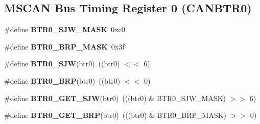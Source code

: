 \subsection*{M\+S\+C\+AN Bus Timing Register 0 (C\+A\+N\+B\+T\+R0)}
\begin{DoxyCompactItemize}
\item 
\mbox{\label{group__RTEMSBSPsPowerPCGen5200MSCAN_ga2837588f706fbf1850d8aadd7346655f}} 
\#define {\bfseries B\+T\+R0\+\_\+\+S\+J\+W\+\_\+\+M\+A\+SK}~0xc0
\item 
\mbox{\label{group__RTEMSBSPsPowerPCGen5200MSCAN_gab863420dd9b9aba2cc0e7e1f03f2c43e}} 
\#define {\bfseries B\+T\+R0\+\_\+\+B\+R\+P\+\_\+\+M\+A\+SK}~0x3f
\item 
\mbox{\label{group__RTEMSBSPsPowerPCGen5200MSCAN_ga30a29b01f89f3fe21ddac05c32a41b07}} 
\#define {\bfseries B\+T\+R0\+\_\+\+S\+JW}(btr0)~((btr0) $<$$<$ 6)
\item 
\mbox{\label{group__RTEMSBSPsPowerPCGen5200MSCAN_ga4943d2025c9b0978f3b5d155f8b93396}} 
\#define {\bfseries B\+T\+R0\+\_\+\+B\+RP}(btr0)~((btr0) $<$$<$ 0)
\item 
\mbox{\label{group__RTEMSBSPsPowerPCGen5200MSCAN_gabd5032d8668ccf5250d26463c6443308}} 
\#define {\bfseries B\+T\+R0\+\_\+\+G\+E\+T\+\_\+\+S\+JW}(btr0)~(((btr0) \& B\+T\+R0\+\_\+\+S\+J\+W\+\_\+\+M\+A\+SK) $>$$>$ 6)
\item 
\mbox{\label{group__RTEMSBSPsPowerPCGen5200MSCAN_gab3cb982bf563c9c882a3bfb5482de527}} 
\#define {\bfseries B\+T\+R0\+\_\+\+G\+E\+T\+\_\+\+B\+RP}(btr0)~(((btr0) \& B\+T\+R0\+\_\+\+B\+R\+P\+\_\+\+M\+A\+SK) $>$$>$ 0)
\end{DoxyCompactItemize}
